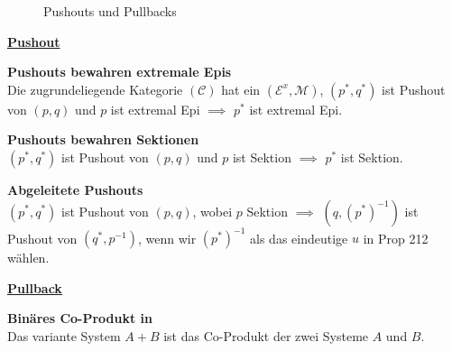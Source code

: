 \begin{figure}[h]
\centering
{} \qquad \qquad \qquad
{}
\caption{Pushouts und Pullbacks}
\end{figure}

\newpage 

\begin{multicols}{2}

\textbf{\underline{Pushout}} 

\textbf{ Pushouts bewahren extremale Epis} \\
Die zugrundeliegende Kategorie $(\mathcal{C})$ hat ein $(\mathcal{E}^x, \mathcal{M})$, $(p^*, q^*)$ ist Pushout von $(p,q)$ und $p$ ist extremal Epi $\implies$ $p^*$ ist extremal Epi.

\textbf{ Pushouts bewahren Sektionen} \\
$(p^*, q^*)$ ist Pushout von $(p,q)$ und $p$ ist Sektion $\implies $ $p^*$ ist Sektion.

\textbf{ Abgeleitete Pushouts} \\
$(p^*, q^*)$ ist Pushout von $(p,q)$, wobei $p$ Sektion $\implies$ $\left ( q, (p^*)^{-1} \right )$ ist Pushout von $(q^*, p^{-1})$, wenn wir $(p^*)^{-1}$ als das eindeutige $u$ in Prop 212 wählen.

\columnbreak

\textbf{\underline{Pullback}} 

\textbf{ Binäres Co-Produkt in \syssig} \\
Das variante System $A + B$ ist das Co-Produkt der zwei Systeme $A$ und $B$.

\end{multicols}


